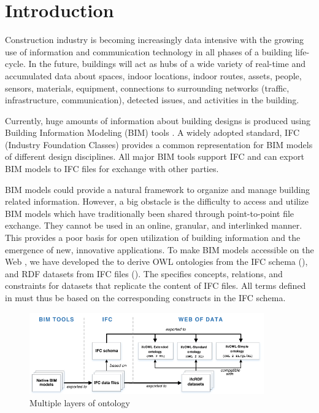 \section{Introduction}
\label{sec:Introduction}

Construction industry is becoming increasingly data intensive with the growing use of
information and communication technology in all phases of a building life-cycle. 
In the future, buildings will act as hubs of a wide variety of real-time and accumulated data about
spaces, indoor locations, indoor routes, assets, people, sensors, materials, equipment, connections
to surrounding networks (traffic, infrastructure, communication), detected issues, and 
activities in the building.

Currently, huge amounts of information about building designs is produced  
using Building Information Modeling (BIM) tools \cite{eastman2011bim}. A widely adopted standard, 
IFC (Industry Foundation Classes) \cite{ISO16739,liebich2010unveiling} provides a common representation for BIM models of 
different design disciplines. All major BIM tools support IFC and can export BIM models to IFC files for exchange with other parties.

BIM models could provide a natural framework to organize and manage building related information. However, a big obstacle is the difficulty to access and utilize BIM models which have traditionally been shared through point-to-point file exchange. They cannot be used in an online, granular, and 
interlinked manner. This provides a poor basis for open utilization of building information and the 
emergence of new, innovative applications.
To make BIM models accessible on the Web \cite{torma2014wobd}, we have developed the 
 to 
derive OWL ontologies from the IFC schema (\ifcowl{}), and RDF datasets from IFC files 
(\ifcrdf{}). The \ifcowl{} specifies concepts, relations, and constraints for \ifcrdf{} datasets that replicate the content of IFC files. 
All terms defined in \ifcowl{}  must thus be based on the corresponding constructs in 
the IFC schema. 

\begin{figure}[h]
\centering
\includegraphics[angle=0,width=0.9\textwidth]{images/ifcOWL-multilayers.png}
\caption{Multiple layers of \ifcowl{} ontology}
\label{fig:ifcOWL-layers}
\end{figure}

